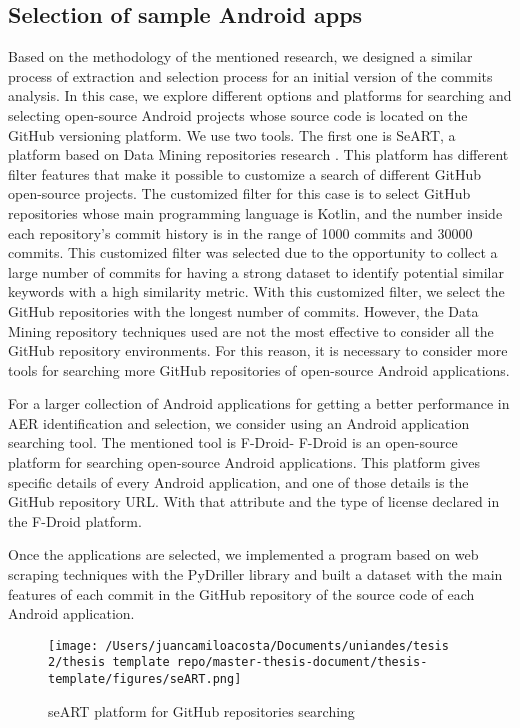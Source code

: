 \subsection{Selection of sample Android apps}
Based on the methodology of the mentioned research, we designed a similar process of extraction and selection process for an initial version of the commits analysis. In this case, we explore different options and platforms for searching and selecting open-source Android projects whose source code is located on the GitHub versioning platform. We use two tools. The first one is SeART, a platform based on Data Mining repositories research \cite{seart_platform}. This platform has different filter features that make it possible to customize a search of different GitHub open-source projects. The customized filter for this case is to select GitHub repositories whose main programming language is Kotlin, and the number inside each repository's commit history is in the range of 1000 commits and 30000 commits. This customized filter was selected due to the opportunity to collect a large number of commits for having a strong dataset to identify potential similar keywords with a high similarity metric. With this customized filter, we select the GitHub repositories with the longest number of commits. However, the Data Mining repository techniques used are not the most effective to consider all the GitHub repository environments. For this reason, it is necessary to consider more tools for searching more GitHub repositories of open-source Android applications.



For a larger collection of Android applications for getting a better performance in AER identification and selection, we consider using an Android application searching tool. The mentioned tool is F-Droid- F-Droid is an open-source platform for searching open-source Android applications. This platform gives specific details of every Android application, and one of those details is the GitHub repository URL. With that attribute and the type of license declared in the F-Droid platform.

Once the applications are selected, we implemented a program based on web scraping techniques with the PyDriller library and built a dataset with the main features of each commit in the GitHub repository of the source code of each Android application.

\begin{figure}[h]
    	\centering
    		\texttt{[image: /Users/juancamiloacosta/Documents/uniandes/tesis 2/thesis template repo/master-thesis-document/thesis-template/figures/seART.png]}
   			 \caption{seART platform for GitHub repositories searching \cite{} }
   			 \label{fig:ast}
\end{figure}

